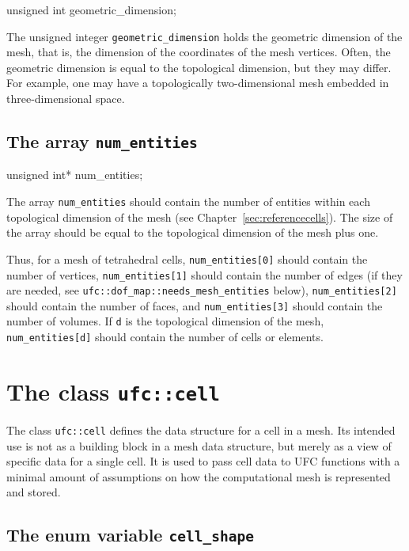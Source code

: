 \begin{code}
unsigned int geometric_dimension;
\end{code}

The unsigned integer \texttt{geometric\_dimension} holds the geometric
dimension of the mesh, that is, the dimension of the coordinates of
the mesh vertices.  Often, the geometric dimension is equal to the
topological dimension, but they may differ. For example, one may have
a topologically two-dimensional mesh embedded in three-dimensional
space.

\subsection{The array \texttt{num\_entities}}

\begin{code}
unsigned int* num_entities;
\end{code}

The array \texttt{num\_entities} should contain the number of entities
within each topological dimension of the mesh (see
Chapter~\ref{sec:referencecells}). The size of the array should be
equal to the topological dimension of the mesh plus one.

Thus, for a mesh of tetrahedral cells, \texttt{num\_entities[0]}
should contain the number of vertices, \texttt{num\_entities[1]}
should contain the number of edges (if they are needed, see
\texttt{ufc::dof\_map::needs\_mesh\_entities} below),
\texttt{num\_en\-tities[2]} should contain the number of faces, and
\texttt{num\_entities[3]} should contain the number of volumes.  If
\texttt{d} is the topological dimension of the mesh,
\texttt{num\_entities[d]} should contain the number of cells or
elements.

\section{The class \texttt{ufc::cell}}

The class \texttt{ufc::cell} defines the data structure for a cell in
a mesh. Its intended use is not as a building block in a mesh data
structure, but merely as a view of specific data for a single cell.
It is used to pass cell data to UFC functions with a minimal amount of
assumptions on how the computational mesh is represented and stored.

\subsection{The enum variable \texttt{cell\_shape}}

